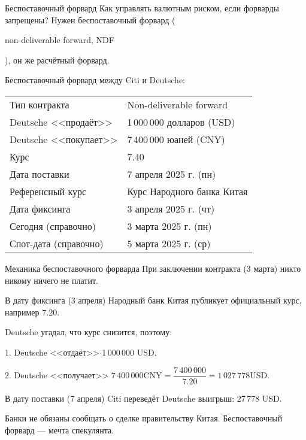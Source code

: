 \documentclass{beamer}
\newcommand{\en}[1]{\begin{otherlanguage}{english}#1\end{otherlanguage}}
\begin{document}
\begin{frame}{Беспоставочный форвард}
\justify
Как управлять валютным риском, если форварды запрещены? Нужен \alert{беспоставочный форвард} (\en{non-deliverable forward, NDF}), он же расчётный форвард.

\justify
Беспоставочный форвард между Citi и Deutsche:

\justify
\centering
\begin{tabular}{l|l}
	Тип контракта 		   & Non-deliverable forward		\\
	Deutsche <<продаёт>>  & 1\,000\,000 долларов (USD)	\\
	Deutsche <<покупает>> & 7\,400\,000 юаней (CNY)		\\
	Курс		 		      & 7.40 						\\
	Дата поставки		   & 7 апреля 2025 г. (пн) \\
	Референсный курс	   & Курс Народного банка Китая	\\
	Дата фиксинга		   & 3 апреля 2025 г. (чт) \\
	Сегодня (справочно)	& 3 марта 2025 г. (пн) \\
	Спот-дата (справочно) & 5 марта 2025 г. (ср)
\end{tabular}
\end{frame}



\begin{frame}{Механика беспоставочного форварда}
\justify
При заключении контракта (3 марта) никто никому ничего не платит.

\justify
В дату фиксинга (3 апреля) Народный банк Китая публикует официальный курс, например 7.20.

\justify
Deutsche угадал, что курс снизится, поэтому:

1. Deutsche <<отдаёт>> 1\,000\,000 USD.

2. Deutsche <<получает>> $7\,400\,000 \text{CNY} = \dfrac{7\,400\,000}{7.20} = 1\,027\,778 \text{USD}$.

\justify
В дату поставки (7 апреля) Citi переведёт Deutsche выигрыш: 27\,778 USD.

\justify Банки не обязаны сообщать о сделке правительству Китая. Беспоставочный форвард --- мечта спекулянта.
\end{frame}
\end{document}
